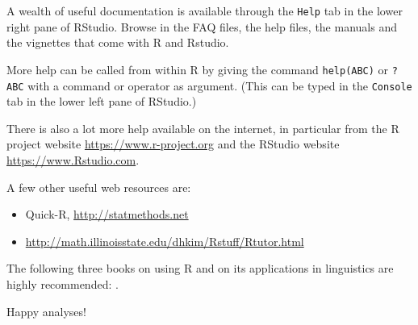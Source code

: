 \documentclass[]{book}
\begin{document}
A wealth of useful documentation is available through the \texttt{Help} tab
in the lower right pane of RStudio. Browse in the FAQ files, the help files, the
manuals and the vignettes that come with R and Rstudio.

More help can be called from within R by giving the command
\texttt{help(ABC)} or \texttt{?ABC} with a
command or operator as argument.
(This can be typed in the \texttt{Console} tab in the lower left pane of RStudio.)

There is also a lot more help available on the internet, in particular
from the R project website \url{https://www.r-project.org}
and the RStudio website \url{https://www.Rstudio.com}.

A few other useful web resources are:

\begin{itemize}
\item
  Quick-R, \url{http://statmethods.net}
\item
  \url{http://math.illinoisstate.edu/dhkim/Rstuff/Rtutor.html}
\end{itemize}

The following three books on using R and on its
applications in linguistics are highly recommended:
\citep{baay08, john08, adler10}.

Happy analyses!


\end{document}
